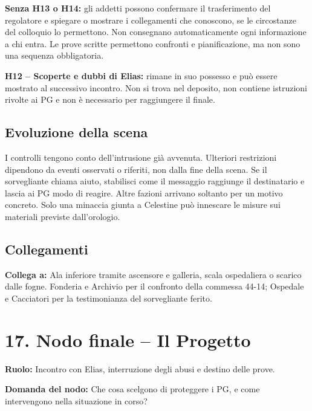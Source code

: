 \documentclass[11pt,a4paper]{article}
\newcommand{\yhdivider}{%
  \par\nobreak\noindent
  \begin{tikzpicture}
    \fill[brass!85] (0,0) -- (0,.7mm) -- (\linewidth,.18mm) -- cycle;
  \end{tikzpicture}\par\nobreak}
\newcommand{\nodehead}[3]{%
\clearpage
{\titleformat{\section}{\displayfont\huge\scshape\color{blood}}{}{0pt}{}[\yhdivider]%
\section{#1}}
\begin{bloodbox}[title={Il nodo al tavolo}]
\textbf{Ruolo:} #2\par\smallskip
\textbf{Domanda del nodo:} #3
\end{bloodbox}}
\newcommand{\linkto}[1]{\begin{routebox}\textbf{Collega a:} #1\end{routebox}}
\begin{document}
\textbf{Senza H13 o H14:} gli addetti possono confermare il trasferimento del regolatore e spiegare o mostrare i collegamenti che conoscono, se le circostanze del colloquio lo permettono. Non consegnano automaticamente ogni informazione a chi entra. Le prove scritte permettono confronti e pianificazione, ma non sono una sequenza obbligatoria.

\textbf{H12 -- Scoperte e dubbi di Elias:} rimane in suo possesso e può essere mostrato al successivo incontro. Non si trova nel deposito, non contiene istruzioni rivolte ai PG e non è necessario per raggiungere il finale.

\subsection{Evoluzione della scena}
\begin{clockbox}
I controlli tengono conto dell'intrusione già avvenuta. Ulteriori restrizioni dipendono da eventi osservati o riferiti, non dalla fine della scena. Se il sorvegliante chiama aiuto, stabilisci come il messaggio raggiunge il destinatario e lascia ai PG modo di reagire. Altre fazioni arrivano soltanto per un motivo concreto. Solo una minaccia giunta a Celestine può innescare le misure sui materiali previste dall'orologio.
\end{clockbox}

\subsection{Collegamenti}
\linkto{Ala inferiore tramite ascensore e galleria, scala ospedaliera o scarico dalle fogne. Fonderia e Archivio per il confronto della commessa 44-14; Ospedale e Cacciatori per la testimonianza del sorvegliante ferito.}

\nodehead{17. Nodo finale -- Il Progetto}{Incontro con Elias, interruzione degli abusi e destino delle prove.}{Che cosa scelgono di proteggere i PG, e come intervengono nella situazione in corso?}
\end{document}
